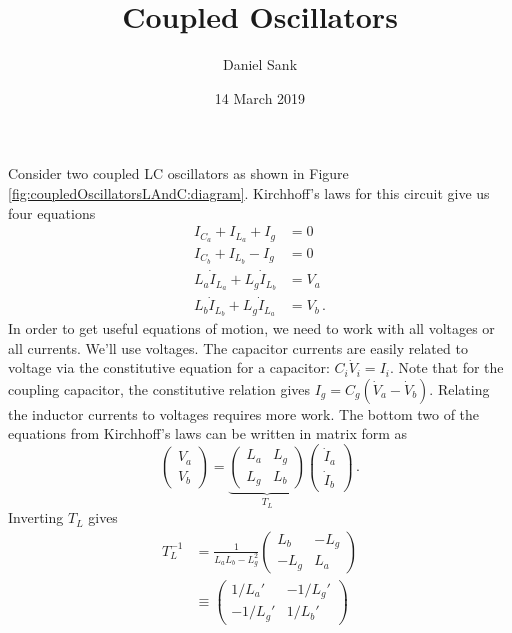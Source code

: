 \documentclass{article}
\author{Daniel Sank}
\date{14 March 2019}
\title{Coupled Oscillators}
\begin{document}
\maketitle


Consider two coupled LC oscillators as shown in Figure \ref{fig:coupledOscillatorsLAndC:diagram}.
Kirchhoff's laws for this circuit give us four equations
\begin{align}
  I_{C_a} + I_{L_a} + I_g &= 0 \nonumber \\
  I_{C_b} + I_{L_b} - I_g &= 0 \nonumber \\
  L_a \dot I_{L_a} + L_g \dot I_{L_b} &= V_a \nonumber \\
  L_b \dot I_{L_b} + L_g \dot I_{L_a} &= V_b
  \, .
\end{align}
In order to get useful equations of motion, we need to work with all voltages or all currents.
We'll use voltages.
The capacitor currents are easily related to voltage via the constitutive equation for a capacitor: $C_i \dot V_i = I_i$.
Note that for the coupling capacitor, the constitutive relation gives $I_g = C_g (\dot V_a - \dot V_b)$.
Relating the inductor currents to voltages requires more work.
The bottom two of the equations from Kirchhoff's laws can be written in matrix form as
\begin{equation*}
  \left( \begin{array}{c}
    V_a \\ V_b
  \end{array}\right)
  = \underbrace{ \left( \begin{array}{cc}
    L_a & L_g \\
    L_g & L_b
  \end{array} \right)}_{T_L}
  \left( \begin{array}{c}
    \dot I_a \\ \dot I_b
  \end{array}\right)
  \, .
\end{equation*}
Inverting $T_L$ gives
\begin{align*}
  T_L^{-1}
  &= \frac{1}{L_a L_b - L_g^2} \left( \begin{array}{cc}
    L_b & -L_g \\ -L_g & L_a
  \end{array} \right) \\
  & \equiv \left( \begin{array}{cc}
    1 / L_a' & -1 / L_g' \\ -1 / L_g' & 1 / L_b'
  \end{array} \right)
\end{align*}
\end{document}
